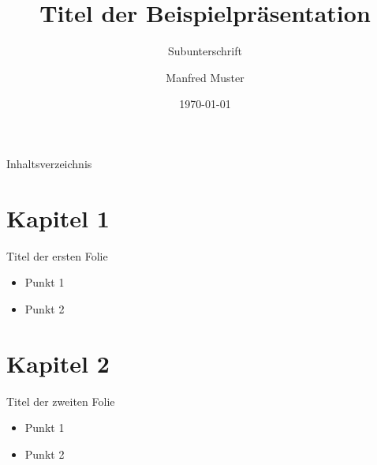 \documentclass{beamer}
\begin{document}
\title[Kurzform des Titels]{Titel der Beispielpräsentation}
\subtitle[Kurzform Subunterschrift]{Subunterschrift}
\author[mamu]{Manfred Muster}
\date{\today\\\vspace{0.5cm}} %

\begin{frame}
\titlepage	
\end{frame}
\begin{frame}{Inhaltsverzeichnis}
	\tableofcontents
\end{frame}
\section{Kapitel 1}
\begin{frame}{Titel der ersten Folie}
\begin{itemize}
	\item Punkt 1
	\item Punkt 2
\end{itemize}
\end{frame}
\section{Kapitel 2}
\begin{frame}{Titel der zweiten Folie}
	\begin{itemize}
		\item Punkt 1
		\item Punkt 2
	\end{itemize}
\end{frame}
\end{document}
